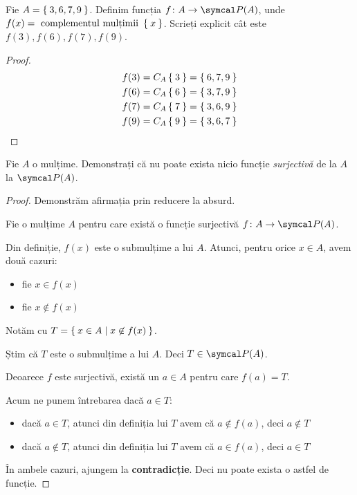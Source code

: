 \begin{exercise}
Fie \(A = \Set{ 3, 6, 7, 9 }\).
Definim funcția \(\function{f}{A}{\powerset(A)}\), unde \(f(x) = \text{ complementul mulțimii } \Set{ x }\).
Scrieți explicit cât este \(f(3), f(6), f(7), f(9)\).
\end{exercise}
\begin{proof}
\begin{align*}
    f(3) = C_A \Set{3} = \Set{ 6, 7, 9 } \\
    f(6) = C_A \Set{6} = \Set{ 3, 7, 9 } \\
    f(7) = C_A \Set{7} = \Set{ 3, 6, 9 } \\
    f(9) = C_A \Set{9} = \Set{ 3, 6, 7 }
\end{align*}
\end{proof}

\begin{exercise}
Fie \(A\) o mulțime. Demonstrați că nu poate exista nicio funcție \emph{surjectivă} de la \(A\) la \(\powerset(A)\).
\end{exercise}
\begin{proof}
Demonstrăm afirmația prin reducere la absurd.

Fie o mulțime \(A\) pentru care există o funcție surjectivă \(\function{f}{A}{\powerset(A)}\).

Din definiție, \(f(x)\) este o submulțime a lui \(A\). Atunci, pentru orice \(x \in A\), avem două cazuri:
\begin{itemize}
    \item fie \(x \in f(x)\)
    \item fie \(x \not\in f(x)\)
\end{itemize}

Notăm cu \(T = \Set{ x \in A | x \not\in f(x) }\).

Știm că \(T\) este o submulțime a lui \(A\). Deci \(T \in \powerset(A)\).

Deoarece \(f\) este surjectivă, există un \(a \in A\) pentru care \(f(a) = T\).

Acum ne punem întrebarea dacă \(a \in T\):
\begin{itemize}
    \item dacă \(a \in T\), atunci din definiția lui \(T\) avem că \(a \not\in f(a)\), deci \(a \not\in T\)
    \item dacă \(a \not\in T\), atunci din definiția lui \(T\) avem că \(a \in f(a)\), deci \(a \in T\)
\end{itemize}
În ambele cazuri, ajungem la \textbf{contradicție}. Deci nu poate exista o astfel de funcție.
\end{proof}

